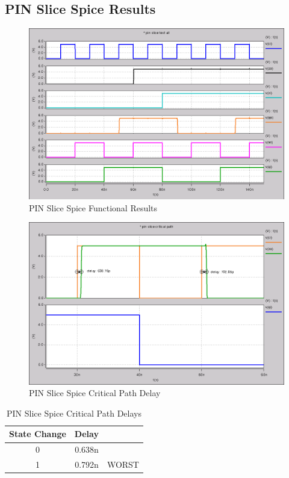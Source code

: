     \subsection{PIN Slice Spice Results}
        
        \begin{figure}[H]
            \centering
            \includegraphics[width=0.75\linewidth]{../../spice/pin_slice_all.png}
            \caption{PIN Slice Spice Functional Results}
        \end{figure}
        \begin{figure}[H]
            \centering
            \includegraphics[width=0.75\linewidth]{../../spice/pin_slice_crit_path.png}
            \caption{PIN Slice Spice Critical Path Delay}
        \end{figure}
        \begin{table}[H]
            \centering
            \begin{tabular}{crc}
                \toprule
                \textbf{State Change} & \textbf{Delay} & \\
                \midrule
                0 & 0.638n & \\
                1 & 0.792n & WORST \\
                \bottomrule
            \end{tabular}
            \caption{PIN Slice Spice Critical Path Delays}
        \end{table}

